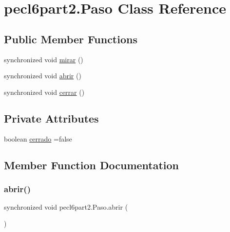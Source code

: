 \hypertarget{classpecl6part2_1_1_paso}{}\section{pecl6part2.\+Paso Class Reference}
\label{classpecl6part2_1_1_paso}
\subsection*{Public Member Functions}
\begin{DoxyCompactItemize}
\item 
synchronized void \mbox{\hyperlink{classpecl6part2_1_1_paso_a374d70af70d81631660741eb340af6ce}{mirar}} ()
\item 
synchronized void \mbox{\hyperlink{classpecl6part2_1_1_paso_a88a25090462335e5c21d6bbdd68f5a5e}{abrir}} ()
\item 
synchronized void \mbox{\hyperlink{classpecl6part2_1_1_paso_a3868cf1f106bb5b195ea9a7e44c3644a}{cerrar}} ()
\end{DoxyCompactItemize}
\subsection*{Private Attributes}
\begin{DoxyCompactItemize}
\item 
boolean \mbox{\hyperlink{classpecl6part2_1_1_paso_a85e74043053dddfb00933f2982980d19}{cerrado}} =false
\end{DoxyCompactItemize}


\subsection{Member Function Documentation}
\mbox{\label{classpecl6part2_1_1_paso_a88a25090462335e5c21d6bbdd68f5a5e}} 
\subsubsection{\texorpdfstring{abrir()}{abrir()}}
{\footnotesize\ttfamily synchronized void pecl6part2.\+Paso.\+abrir (\begin{DoxyParamCaption}{ }\end{DoxyParamCaption})\hspace{0.3cm}{\ttfamily [inline]}}


